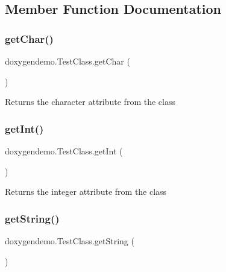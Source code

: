 \subsection{Member Function Documentation}
\mbox{\label{classdoxygendemo_1_1_test_class_a46cf9baec135f19f9eb7dc01e1c0c126}} 
\subsubsection{\texorpdfstring{get\+Char()}{getChar()}}
{\footnotesize\ttfamily doxygendemo.\+Test\+Class.\+get\+Char (\begin{DoxyParamCaption}{ }\end{DoxyParamCaption})}

\begin{DoxyReturn}{Returns}
the character attribute from the class 
\end{DoxyReturn}
\mbox{\label{classdoxygendemo_1_1_test_class_a70371a9bd69ded1856d919c36bd2f217}} 
\subsubsection{\texorpdfstring{get\+Int()}{getInt()}}
{\footnotesize\ttfamily doxygendemo.\+Test\+Class.\+get\+Int (\begin{DoxyParamCaption}{ }\end{DoxyParamCaption})}

\begin{DoxyReturn}{Returns}
the integer attribute from the class 
\end{DoxyReturn}
\mbox{\label{classdoxygendemo_1_1_test_class_ae17e0f53c5f1a33316cf76c7641f3ce4}} 
\subsubsection{\texorpdfstring{get\+String()}{getString()}}
{\footnotesize\ttfamily doxygendemo.\+Test\+Class.\+get\+String (\begin{DoxyParamCaption}{ }\end{DoxyParamCaption})}

